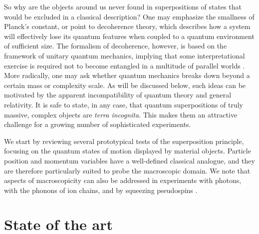 \documentclass[11pt]{article}
\begin{document}
So why are the objects around us never found in superpositions of 
states that would be excluded in a classical description?
One may emphasize the smallness of Planck's constant, 
or point to decoherence
theory, which describes how a system will effectively lose its quantum features when coupled to a quantum environment of sufficient 
size\cite{Joos2003,Zurek2003}.
The formalism of decoherence, however, is based on the framework of unitary quantum mechanics,
implying that some interpretational exercise is required not to become entangled in a multitude of parallel worlds \cite{laloe2012}.
More radically, one may ask whether quantum mechanics 
breaks down beyond a certain mass or complexity scale. As will be discussed below, such ideas can be motivated by the apparent incompatibility of 
quantum theory and general relativity.
It is safe to state, in any case,  that quantum superpositions of truly massive, complex  objects  are \emph{terra incognita}.
This makes them an attractive challenge for a growing number of sophisticated experiments.

We start by reviewing several prototypical tests of the superposition principle, focusing on the quantum states of motion displayed by  material objects. Particle position and momentum variables have a 
well-defined classical analogue, and they are therefore particularly
suited to probe the macroscopic domain.
We note that aspects of macroscopicity can also be addressed in experiments with photons\cite{Fickler2012,Ma2012,Kirchmair2013}, with the phonons of ion chains\cite{Monz2011}, 
and by squeezing pseudospins 
\cite{julsgaard2001experimental,Gross2010}.

\section{State of the art}
\end{document}
